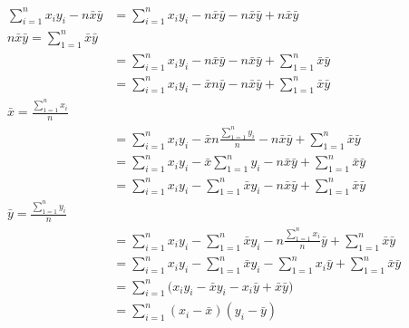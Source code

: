 \begin{align*}
\sum_{i=1}^{n}  x_i y_i - n\bar{x}\bar{y} & = \sum_{i=1}^{n}x_i y_i - n\bar{x}\bar{y} - n\bar{x}\bar{y} + n\bar{x}\bar{y} \\ %
n\bar{x}\bar{y} = \sum_{1=1}^{n}\bar{x}\bar{y} \\ %
& = \sum_{i=1}^{n}x_i y_i - n\bar{x}\bar{y} - n\bar{x}\bar{y} + \sum_{1=1}^{n}\bar{x}\bar{y} \\ %
& = \sum_{i=1}^{n}x_i y_i - \bar{x}n\bar{y} - n\bar{x}\bar{y} + \sum_{1=1}^{n}\bar{x}\bar{y} \\ %
\bar{x} = \frac{\sum_{1=1}^{n}x_i}{n} \\ %
& = \sum_{i=1}^{n}x_i y_i - \bar{x}n\frac{\sum_{1=1}^{n}y_i}{n} - n\bar{x}\bar{y} + \sum_{1=1}^{n}\bar{x}\bar{y} \\ %
& = \sum_{i=1}^{n}x_i y_i - \bar{x}\sum_{1=1}^{n}y_i - n\bar{x}\bar{y} + \sum_{1=1}^{n}\bar{x}\bar{y} \\ %
& = \sum_{i=1}^{n}x_i y_i - \sum_{1=1}^{n}\bar{x}y_i - n\bar{x}\bar{y} + \sum_{1=1}^{n}\bar{x}\bar{y} \\ %
 \bar{y} = \frac{\sum_{1=1}^{n}y_i}{n} \\  %
& = \sum_{i=1}^{n}x_i y_i - \sum_{1=1}^{n}\bar{x}y_i - n\frac{\sum_{1=1}^{n}x_i}{n}\bar{y} + \sum_{1=1}^{n}\bar{x}\bar{y} \\ %
& = \sum_{i=1}^{n}x_i y_i - \sum_{1=1}^{n}\bar{x}y_i - \sum_{1=1}^{n}x_i\bar{y} + \sum_{1=1}^{n}\bar{x}\bar{y} \\ %
& = \sum_{i=1}^{n}\big(x_i y_i - \bar{x}y_i - x_i \bar{y} + \bar{x}\bar{y}\big) \\ %
& = \sum_{i=1}^{n}(x_i - \bar{x})(y_i - \bar{y}) \\
\end{align*}